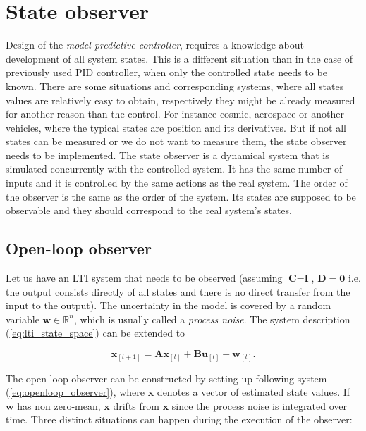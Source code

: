 \section{State observer}
\label{cap:state_observer}

Design of the \textit{model predictive controller}, requires a knowledge about development of all system states. This is a different situation than in the case of previously used PID controller, when only the controlled state needs to be known. There are some situations and corresponding systems, where all states values are relatively easy to obtain, respectively they might be already measured for another reason than the control. For instance cosmic, aerospace or another vehicles, where the typical states are position and its derivatives. But if not all states can be measured or we do not want to measure them, the state observer needs to be implemented. The state observer is a dynamical system that is simulated concurrently with the controlled system. It has the same number of inputs and it is controlled by the same actions as the real system. The order of the observer is the same as the order of the system. Its states are supposed to be observable and they should correspond to the real system's states.

\subsection{Open-loop observer}

Let us have an LTI system that needs to be observed (assuming $\textbf{C} = \textbf{I}$, $\textbf{D} = \mathbf{0}$ i.e. the output consists directly of all states and there is no direct transfer from the input to the output). The uncertainty in the model is covered by a random variable $\textbf{w} \in \mathbb{R}^n$, which is usually called a \emph{process noise}. The system description (\ref{eq:lti_state_space}) can be extended to

\begin{equation}
\textbf{x}_{[t+1]} = \textbf{A}\textbf{x}_{[t]} + \textbf{B}\textbf{u}_{[t]} + \textbf{w}_{[t]}.
\label{eq:lti_for_observer}
\end{equation}

The open-loop observer can be constructed by setting up following system (\ref{eq:openloop_observer}), where $\textbf{\^x}$ denotes a vector of estimated state values. If $\textbf{w}$ has non zero-mean, $\textbf{\^x}$ drifts from $\textbf{x}$ since the process noise is integrated over time. Three distinct situations can happen during the execution of the observer:

